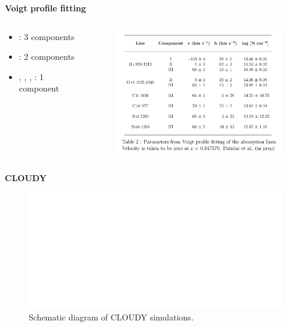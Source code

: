 {}\begin{frame}{\huge{{\textbf{Voigt profile fitting}}}}\markdownRendererInterblockSeparator
{}\begin{columns} \begin{column}{0.4\textwidth} \vspace{-10mm} \begin{itemize} \item {} : 3 components \item {} : 2 components \item {}, , ,  : 1 component \end{itemize} \end{column} \begin{column}{0.6\textwidth} \vspace{-3mm} \begin{figure}[!htbp] \centering \includegraphics[width=8cm]{Figures/Mid-term/param.png} \end{figure} \end{column} \end{columns}\markdownRendererInterblockSeparator
{}\end{frame}\markdownRendererInterblockSeparator
{}\begin{frame}[noframenumbering]{\textbf{CLOUDY}}\markdownRendererInterblockSeparator
{}\begin{figure}[!htbp] \centering \includegraphics[width=12cm]{Figures/Mid-term/cloudy-transparent.png} \vspace*{-1mm} \caption{Schematic diagram of CLOUDY simulations.} \end{figure}\markdownRendererInterblockSeparator
{}\end{frame}\markdownRendererInterblockSeparator

